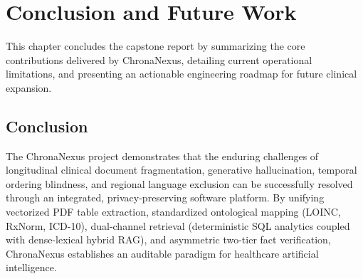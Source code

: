 \chapter{Conclusion and Future Work}
\label{chap:conclusion}

This chapter concludes the capstone report by summarizing the core contributions delivered by ChronaNexus, detailing current operational limitations, and presenting an actionable engineering roadmap for future clinical expansion.

\section{Conclusion}
\label{sec:conclusion_summary}

The ChronaNexus project demonstrates that the enduring challenges of longitudinal clinical document fragmentation, generative hallucination, temporal ordering blindness, and regional language exclusion can be successfully resolved through an integrated, privacy-preserving software platform. By unifying vectorized PDF table extraction, standardized ontological mapping (LOINC, RxNorm, ICD-10), dual-channel retrieval (deterministic SQL analytics coupled with dense-lexical hybrid RAG), and asymmetric two-tier fact verification, ChronaNexus establishes an auditable paradigm for healthcare artificial intelligence.

